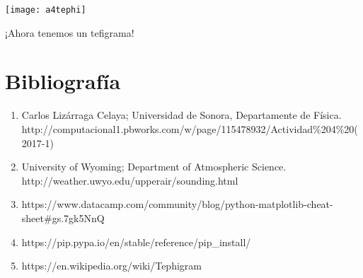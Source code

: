 \documentclass[12pt,a4paper]{article}
\begin{document}
\begin{center}
\texttt{[image: a4tephi]}
\end{center}

\begin{center}
¡Ahora tenemos un tefigrama!
\end{center}

\newpage

\section{Bibliografía}
\begin{enumerate}

\item  Carlos Lizárraga Celaya; Universidad de Sonora, Departamente de Física. \\ http://computacional1.pbworks.com/w/page/115478932/Actividad\%204\%20(2017-1)

\item University of Wyoming; Department of Atmospheric Science. \\
http://weather.uwyo.edu/upperair/sounding.html

\item https://www.datacamp.com/community/blog/python-matplotlib-cheat-sheet\#gs.7gk5NnQ

\item https://pip.pypa.io/en/stable/reference/pip\_install/

\item https://en.wikipedia.org/wiki/Tephigram

\end{enumerate}
\end{document}
